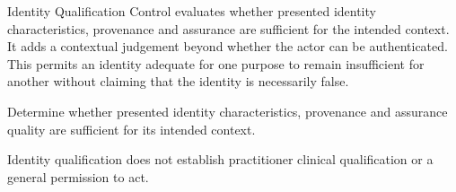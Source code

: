 Identity Qualification Control evaluates whether presented identity characteristics, provenance and assurance are sufficient for the intended context. It adds a contextual judgement beyond whether the actor can be authenticated. This permits an identity adequate for one purpose to remain insufficient for another without claiming that the identity is necessarily false.



Determine whether presented identity characteristics, provenance and assurance quality are sufficient for its intended context.



Identity qualification does not establish practitioner clinical qualification or a general permission to act.


